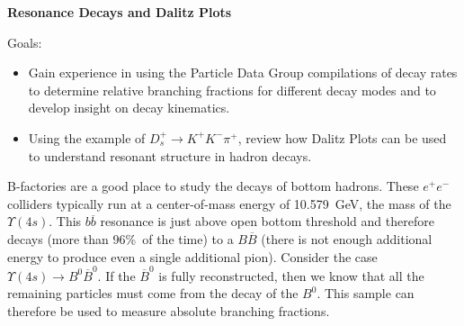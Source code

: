 \documentclass[12pt]{article}
\begin{document}
\begin{center}
{\large\bf Resonance Decays and Dalitz Plots}
\end{center}
\vskip0.2in
Goals:
\begin{itemize}
\item Gain experience in using the Particle Data Group compilations of decay rates to determine
  relative branching fractions for different decay modes and to develop insight on decay kinematics.
\item Using the example of $D_s^{+}\rightarrow K^+K^-\pi^{+}$, review how Dalitz Plots can be used to understand resonant structure in hadron decays.
\end{itemize}
B-factories are a good place to study the decays of bottom hadrons.  These $e^+e^-$
colliders typically
run at a center-of-mass energy of 10.579~GeV, the mass of the $\Upsilon (4s)$.  This
$b\overline b $ resonance is just above open bottom threshold
and therefore decays (more than 96\%\ of the time) to
a $B\overline B$ (there is not enough additional energy to produce even a single additional pion).
Consider the case $\Upsilon (4s)\rightarrow B^0\overline B^0$.  If the $\overline B^0$ is fully reconstructed,
then we know that all the remaining particles must come from the decay of the $B^0$.  This sample
can therefore be used to measure absolute branching fractions.
\end{document}
